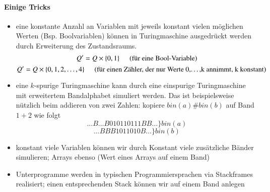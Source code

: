 \paragraph*{Einige Tricks}
\begin{itemize}
	\item eine konstante Anzahl an Variablen mit jeweils konstant vielen möglichen Werten (Bsp. Boolvariablen) können in Turingmaschine ausgedrückt werden durch Erweiterung des Zustandsraums. $$ Q'=Q \times \{0,1\} \hspace{0.5cm}\text{(für eine Bool-Variable)}$$ $$ Q'=Q \times \{ 0,1,2,\dots,4 \} \hspace{0.5cm}\text{(für einen Zähler, der nur Werte 0,\dots,k annimmt, k konstant)} $$
	\item eine $k$-spurige Turingmaschine kann durch eine einspurige Turingmaschine mit erweitertem Bandalphabet simuliert werden. Das ist beispielsweise nützlich beim addieren von zwei Zahlen: kopiere $bin(a)\#bin(b)$ auf Band $1+2$ wie folgt $$ \dots B \dots B010110111BB \dots \} bin(a) $$ $$ \dots BBB1011010B \dots \} bin(b) $$
	\item konstant viele Variablen können wir durch Konstant viele zusätzliche Bänder simulieren; Arrays ebenso (Wert eines Arrays auf einem Band)
	\item Unterprogramme werden in typischen Programmiersprachen via Stackframes realisiert; einen entsprechenden Stack können wir auf einem Band anlegen
\end{itemize}